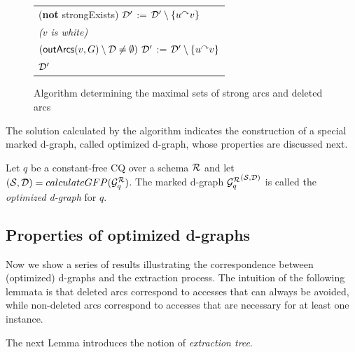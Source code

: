 \begin{figure}[t]
\begin{tabular}{l}
			\quad\quad\quad\codeif (\textbf{not} strongExists) \codethen $\mathcal{D}'$ := $\mathcal{D}'\setminus\{u\mbox{$^{\curvearrowright}$} v\}$\\
		\quad\quad\codeelse \textit{($v$ is white)}\\
			\quad\quad\quad\codeif $(\textsf{outArcs}(v,G)\setminus\mathcal{D}\neq\emptyset)$ \codethen $\mathcal{D}'$ := $\mathcal{D}'\setminus\{u\mbox{$^{\curvearrowright}$} v\}$\\
	\quad\codereturn $\mathcal{D}'$
\end{tabular}
  \caption{Algorithm determining the maximal sets of strong arcs and deleted arcs}
  \label{fig:algoBP}
\end{figure}

The solution calculated by the algorithm indicates the construction of a special marked d-graph, called optimized d-graph, whose properties are discussed next.
%
\begin{definition}\label{def:optimized-d-graph}
Let $q$ be a constant-free
CQ
over a schema $\mathcal{R}$
and let $(\mathcal{S},\mathcal{D})=calculateGFP(\mathcal{G}_q^{\mathcal{R}})$. The marked d-graph ${\mathcal{G}_q^{\mathcal{R}}}^{(\mathcal{S},\mathcal{D})}$ is called the \emph{optimized d-graph} for $q$.
\end{definition}

\subsection{Properties of optimized d-graphs}\label{subsec:properties-d-graphs}

Now we show a series of results illustrating the correspondence between (optimized)
d-graphs and the extraction process.
The intuition of the following lemmata is that deleted arcs correspond to accesses that can always be avoided, while non-deleted arcs correspond to accesses that are necessary for at least one instance. 

The next Lemma introduces the notion of \emph{extraction tree}.


